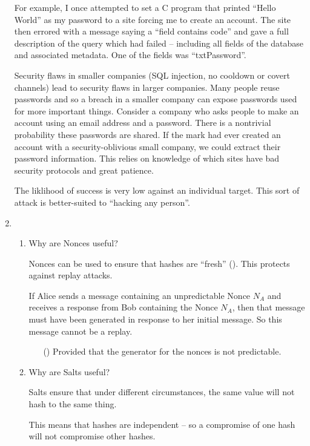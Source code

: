 \documentclass[10pt,\jkfside,a4paper]{article}
\begin{document}
\begin{enumerate}
For example, I once attempted to set a C program that printed ``Hello World'' as my password to 
a site forcing me to create an account. The site then errored with a message saying a ``field 
contains code'' and gave a full description of the query which had failed -- including all fields 
of the database and associated metadata. One of the fields was ``txtPassword''.

Security flaws in smaller companies (SQL injection, no cooldown or covert channels) lead to security 
flaws in larger companies. Many people reuse passwords and so a breach in a smaller company can 
expose passwords used for more important things. Consider a company who asks people to make an 
account using an email address and a password. There is a nontrivial probability these passwords are 
shared. If the mark had ever created an account with a security-oblivious small company, we could extract 
their password information. This relies on knowledge of which sites have bad security protocols and 
great patience. 

The liklihood of success is very low against an individual target. This sort of attack is better-suited 
to ``hacking any person''.

\item 

\begin{enumerate}

\item Why are Nonces useful?

Nonces can be used to ensure that hashes are ``fresh'' (\dag). This protects against replay attacks.

If Alice sends a message containing an unpredictable Nonce $N_A$ and receives a response from Bob 
containing the Nonce $N_A$, then that message must have been generated in response to her initial 
message. So this message cannot be a replay.

\begin{itemize}

\item [(\dag)] Provided that the generator for the nonces is not predictable.

\end{itemize} 

\item Why are Salts useful?

Salts ensure that under different circumstances, the same value will not hash to the same thing. 

This means that hashes are independent -- so a compromise of one hash will not 
compromise other hashes.


\end{enumerate}
\end{enumerate}
\end{document}
